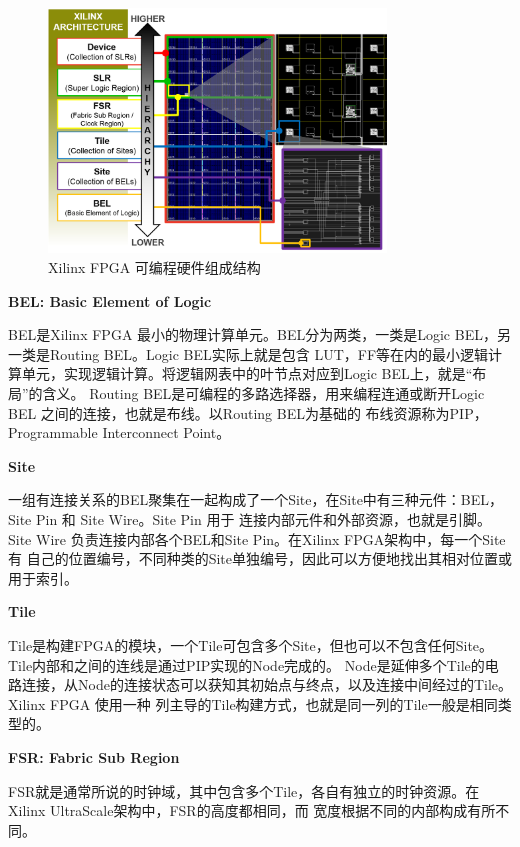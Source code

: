 \begin{figure}[h]
	\centering
	\includegraphics[width=0.8\textwidth]{figure/hierarchy}
	\caption{Xilinx FPGA 可编程硬件组成结构~\cite{lavin2018rapidwright}} 
	\label{fig:hierarchy}
\end{figure}

\vspace{-0.3in}

{\bf BEL: Basic Element of Logic}

BEL是Xilinx FPGA 最小的物理计算单元。BEL分为两类，一类是Logic BEL，另一类是Routing BEL。Logic BEL实际上就是包含
LUT，FF等在内的最小逻辑计算单元，实现逻辑计算。将逻辑网表中的叶节点对应到Logic BEL上，就是“布局”的含义。
Routing BEL是可编程的多路选择器，用来编程连通或断开Logic BEL 之间的连接，也就是布线。以Routing BEL为基础的
布线资源称为PIP，Programmable Interconnect Point。

{\bf Site}

一组有连接关系的BEL聚集在一起构成了一个Site，在Site中有三种元件：BEL，Site Pin 和 Site Wire。Site Pin 用于
连接内部元件和外部资源，也就是引脚。Site Wire 负责连接内部各个BEL和Site Pin。在Xilinx FPGA架构中，每一个Site有
自己的位置编号，不同种类的Site单独编号，因此可以方便地找出其相对位置或用于索引。

{\bf Tile}

Tile是构建FPGA的模块，一个Tile可包含多个Site，但也可以不包含任何Site。Tile内部和之间的连线是通过PIP实现的Node完成的。
Node是延伸多个Tile的电路连接，从Node的连接状态可以获知其初始点与终点，以及连接中间经过的Tile。Xilinx FPGA 使用一种
列主导的Tile构建方式，也就是同一列的Tile一般是相同类型的。

{\bf FSR: Fabric Sub Region}

FSR就是通常所说的时钟域，其中包含多个Tile，各自有独立的时钟资源。在Xilinx UltraScale架构中，FSR的高度都相同，而
宽度根据不同的内部构成有所不同。


